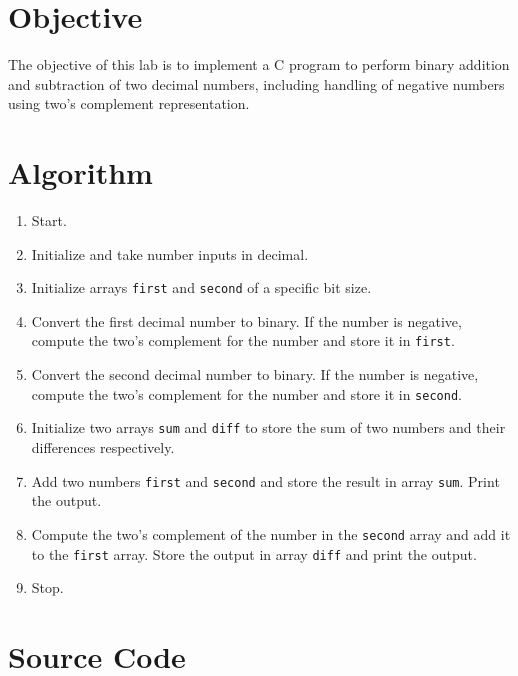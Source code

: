 \documentclass[a4paper,12pt]{article}
\begin{document}
\section*{Objective}
The objective of this lab is to implement a C program to perform binary addition and subtraction of two decimal numbers, including handling of negative numbers using two's complement representation.

\section*{Algorithm}

\begin{enumerate}
    \item Start.
    \item Initialize and take number inputs in decimal.
    \item Initialize arrays \texttt{first} and \texttt{second} of a specific bit size.
    \item Convert the first decimal number to binary. If the number is negative, compute the two's complement for the number and store it in \texttt{first}.
    \item Convert the second decimal number to binary. If the number is negative, compute the two's complement for the number and store it in \texttt{second}.
    \item Initialize two arrays \texttt{sum} and \texttt{diff} to store the sum of two numbers and their differences respectively.
    \item Add two numbers \texttt{first} and \texttt{second} and store the result in array \texttt{sum}. Print the output.
    \item Compute the two's complement of the number in the \texttt{second} array and add it to the \texttt{first} array. Store the output in array \texttt{diff} and print the output.
    \item Stop.
\end{enumerate}

\section*{Source Code}
\end{document}
